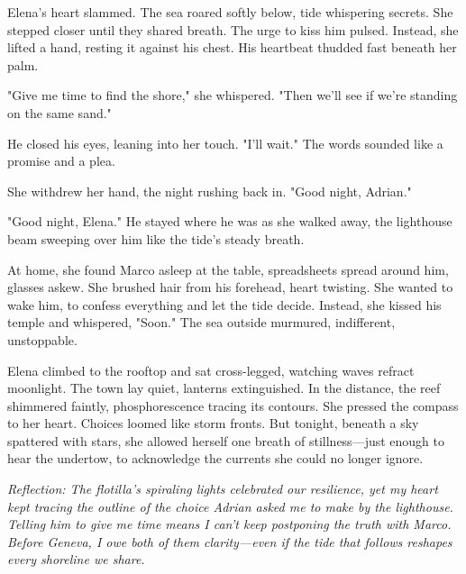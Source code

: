 Elena's heart slammed. The sea roared softly below, tide whispering secrets. She stepped closer until they shared breath. The urge to kiss him pulsed. Instead, she lifted a hand, resting it against his chest. His heartbeat thudded fast beneath her palm.

"Give me time to find the shore," she whispered. "Then we'll see if we're standing on the same sand."

He closed his eyes, leaning into her touch. "I'll wait." The words sounded like a promise and a plea.

She withdrew her hand, the night rushing back in. "Good night, Adrian."

"Good night, Elena." He stayed where he was as she walked away, the lighthouse beam sweeping over him like the tide's steady breath.

At home, she found Marco asleep at the table, spreadsheets spread around him, glasses askew. She brushed hair from his forehead, heart twisting. She wanted to wake him, to confess everything and let the tide decide. Instead, she kissed his temple and whispered, "Soon." The sea outside murmured, indifferent, unstoppable.

Elena climbed to the rooftop and sat cross-legged, watching waves refract moonlight. The town lay quiet, lanterns extinguished. In the distance, the reef shimmered faintly, phosphorescence tracing its contours. She pressed the compass to her heart. Choices loomed like storm fronts. But tonight, beneath a sky spattered with stars, she allowed herself one breath of stillness—just enough to hear the undertow, to acknowledge the currents she could no longer ignore.


\noindent\textit{Reflection: The flotilla's spiraling lights celebrated our resilience, yet my heart kept tracing the outline of the choice Adrian asked me to make by the lighthouse. Telling him to give me time means I can't keep postponing the truth with Marco. Before Geneva, I owe both of them clarity—even if the tide that follows reshapes every shoreline we share.}
